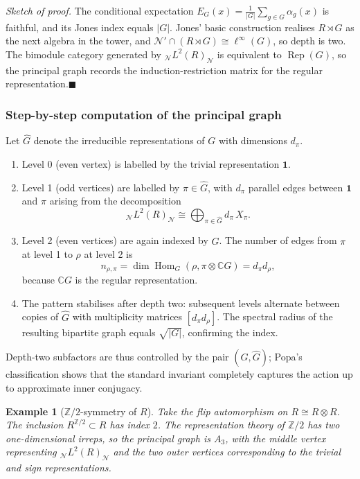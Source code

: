 \documentclass[11pt, a4paper]{article}
\theoremstyle{colored_def}
\theoremstyle{colored_thm}
\theoremstyle{colored_ex}
\newtheorem{example}{Example}[section]
\newcommand{\C}{\mathbb{C}}
\newcommand{\N}{\mathcal{N}}
\begin{document}
\noindent\textit{Sketch of proof.}
The conditional expectation $E_G(x) = \frac{1}{|G|} \sum_{g \in G} \alpha_g(x)$ is faithful, and its Jones index equals $|G|$. Jones' basic construction realises $R \rtimes G$ as the next algebra in the tower, and $\N' \cap (R \rtimes G) \cong \ell^\infty(G)$, so depth is two. The bimodule category generated by ${}_{\N}L^2(R)_{\N}$ is equivalent to $\operatorname{Rep}(G)$, so the principal graph records the induction-restriction matrix for the regular representation.\hfill$\blacksquare$

\subsubsection{Step-by-step computation of the principal graph}

Let $\widehat{G}$ denote the irreducible representations of $G$ with dimensions $d_\pi$.
\begin{enumerate}
    \item Level 0 (even vertex) is labelled by the trivial representation $\mathbf{1}$.
    \item Level 1 (odd vertices) are labelled by $\pi \in \widehat{G}$, with $d_\pi$ parallel edges between $\mathbf{1}$ and $\pi$ arising from the decomposition
    \[
        {}_{\N}L^2(R)_{\N} \cong \bigoplus_{\pi \in \widehat{G}} d_\pi \, X_\pi.
    \]
    \item Level 2 (even vertices) are again indexed by $\widehat{G}$. The number of edges from $\pi$ at level 1 to $\rho$ at level 2 is
    \[
        n_{\rho,\pi} = \dim \operatorname{Hom}_G\!\left(\rho, \pi \otimes \C G\right) = d_\pi d_\rho,
    \]
    because $\mathbb{C}G$ is the regular representation.
    \item The pattern stabilises after depth two: subsequent levels alternate between copies of $\widehat{G}$ with multiplicity matrices $[d_\pi d_\rho]$. The spectral radius of the resulting bipartite graph equals $\sqrt{|G|}$, confirming the index.
\end{enumerate}
Depth-two subfactors are thus controlled by the pair $(G,\widehat{G})$; Popa's classification shows that the standard invariant completely captures the action up to approx\-imate inner conjugacy.

\begin{example}[$\mathbb{Z}/2$-symmetry of $R$]\label{ex:z2}
Take the flip automorphism on $R \cong R \otimes R$. The inclusion $R^{\mathbb{Z}/2} \subset R$ has index $2$. The representation theory of $\mathbb{Z}/2$ has two one-dimensional irreps, so the principal graph is $A_3$, with the middle vertex representing ${}_{\N}L^2(R)_{\N}$ and the two outer vertices corresponding to the trivial and sign representations.
\end{example}
\end{document}
